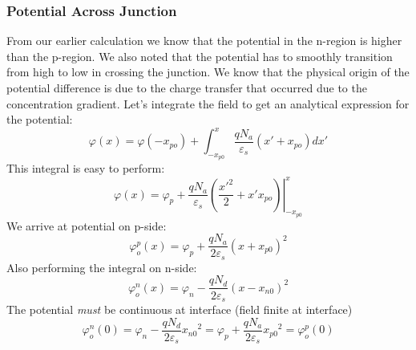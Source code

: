 \subsubsection{Potential Across Junction}
From our earlier calculation we know that the potential in the n-region is higher than the  p-region.  We also noted that the potential has to smoothly transition from high to low in crossing the junction.   We know that the physical origin of the potential difference is due to the charge transfer that occurred due to the concentration gradient.   Let's integrate the field to get an analytical expression for the potential:
\begin{equation}
	\varphi (x) = \varphi ( - {x_{po}}) + \int_{ - {x_{p0}}}^x {\frac{{q{N_a}}}{{{\varepsilon _s}}}(x' + {x_{po}})dx'} 
\end{equation}
This integral is easy to perform:
\begin{equation} 
	\varphi (x) = {\varphi _p} + \left. {\frac{{q{N_a}}}{{{\varepsilon _s}}}\left( {\frac{{x{'^2}}}{2} + x'{x_{po}}} \right)} \right|_{ - {x_{p0}}}^x 
\end{equation}
We arrive at potential on p-side:
\begin{equation}
	\varphi _o^p(x) = {\varphi _p} + \frac{{q{N_a}}}{{2{\varepsilon _s}}}{(x + {x_{p0}})^2} 
\end{equation}
Also performing the integral on n-side:
\begin{equation}
	\varphi _o^n(x) = {\varphi _n} - \frac{{q{N_d}}}{{2{\varepsilon _s}}}{(x - {x_{n0}})^2} 
\end{equation}
The potential \textit{must} be continuous at interface (field finite at interface)
\begin{equation}
	\varphi _o^n(0) = {\varphi _n} - \frac{{q{N_d}}}{{2{\varepsilon _s}}}{{x_{n0}}^2} 
	= {\varphi _p} + \frac{{q{N_a}}}{{2{\varepsilon _s}}}{{x_{p0}}^2} =
	\varphi _o^p(0)
\end{equation}
